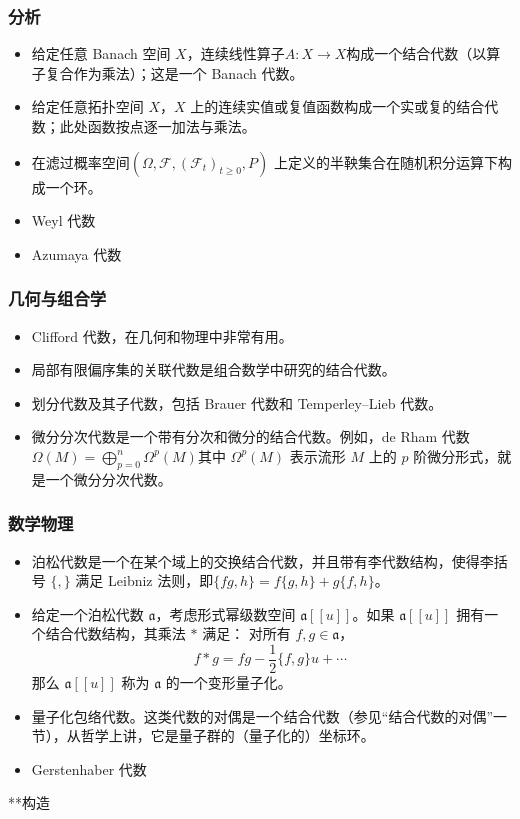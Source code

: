 \subsubsection{分析}
\begin{itemize}
\item 给定任意 Banach 空间 $X$，连续线性算子$A : X \to X$构成一个结合代数（以算子复合作为乘法）；这是一个 Banach 代数。
\item 给定任意拓扑空间 $X$，$X$ 上的连续实值或复值函数构成一个实或复的结合代数；此处函数按点逐一加法与乘法。
\item 在滤过概率空间$(\Omega, \mathcal{F}, (\mathcal{F}_t)_{t \geq 0}, P)$
上定义的半鞅集合在随机积分运算下构成一个环。
\item Weyl 代数
\item Azumaya 代数
\end{itemize}
\subsubsection{几何与组合学}
\begin{itemize}
\item Clifford 代数，在几何和物理中非常有用。
\item 局部有限偏序集的关联代数是组合数学中研究的结合代数。
\item 划分代数及其子代数，包括 Brauer 代数和 Temperley–Lieb 代数。
\item 微分分次代数是一个带有分次和微分的结合代数。例如，de Rham 代数$\Omega(M) = \bigoplus_{p=0}^n \Omega^p(M)$其中 $\Omega^p(M)$ 表示流形 $M$ 上的 $p$ 阶微分形式，就是一个微分分次代数。
\end{itemize}
\subsubsection{数学物理}
\begin{itemize}
\item 泊松代数是一个在某个域上的交换结合代数，并且带有李代数结构，使得李括号 $\{,\}$ 满足 Leibniz 法则，即$\{fg, h\} = f \{g, h\} + g \{f, h\}$。
\item 给定一个泊松代数 $\mathfrak{a}$，考虑形式幂级数空间 $\mathfrak{a}[\![u]\!]$。如果 $\mathfrak{a}[\![u]\!]$ 拥有一个结合代数结构，其乘法 $*$ 满足：
  对所有 $f, g \in \mathfrak{a}$，
  $$
  f * g = fg - \frac{1}{2} \{f, g\} u + \cdots~
  $$
  那么 $\mathfrak{a}[\![u]\!]$ 称为 $\mathfrak{a}$ 的一个变形量子化。
\item 量子化包络代数。这类代数的对偶是一个结合代数（参见“结合代数的对偶”一节），从哲学上讲，它是量子群的（量子化的）坐标环。
\item Gerstenhaber 代数
\end{itemize}
**构造

